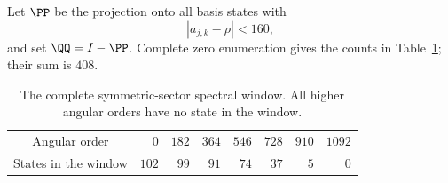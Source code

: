 Let $\PP$ be the projection onto all basis states with
\begin{equation}\label{r2:eq:window}
 |a_{j,k}-\rho|<160,
\end{equation}
and set $\QQ=I-\PP$. Complete zero enumeration gives the counts in Table~\ref{r2:tab:zeros}; their sum is $408$.
\begin{table}[htbp]
\centering
\begin{tabular}{c rrrrrrr}
\toprule
Angular order & $0$ & $182$ & $364$ & $546$ & $728$ & $910$ & $1092$\\
States in the window & $102$ & $99$ & $91$ & $74$ & $37$ & $5$ & $0$\\
\bottomrule
\end{tabular}
\caption{The complete symmetric-sector spectral window. All higher angular orders have no state in the window.}\label{r2:tab:zeros}
\end{table}

